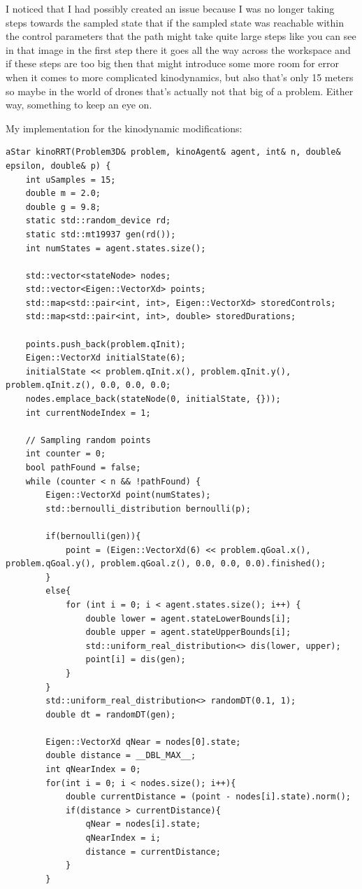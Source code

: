 \documentclass{article}
\begin{document}
I noticed that I had possibly created an issue because I was no longer taking steps towards the sampled state that if the sampled state was reachable within the control parameters that the path might take quite large steps like you can see in that image in the first step there it goes all the way across the workspace and if these steps are too big then that might introduce some more room for error when it comes to more complicated kinodynamics, but also that's only 15 meters so maybe in the world of drones that's actually not that big of a problem.
Either way, something to keep an eye on.

My implementation for the kinodynamic modifications:

\begin{lstlisting}[style=cppstyle]
aStar kinoRRT(Problem3D& problem, kinoAgent& agent, int& n, double& epsilon, double& p) {
    int uSamples = 15;
    double m = 2.0;
    double g = 9.8;
    static std::random_device rd;
    static std::mt19937 gen(rd());
    int numStates = agent.states.size();
    
    std::vector<stateNode> nodes;
    std::vector<Eigen::VectorXd> points;
    std::map<std::pair<int, int>, Eigen::VectorXd> storedControls;
    std::map<std::pair<int, int>, double> storedDurations;

    points.push_back(problem.qInit);
    Eigen::VectorXd initialState(6);
    initialState << problem.qInit.x(), problem.qInit.y(), problem.qInit.z(), 0.0, 0.0, 0.0;
    nodes.emplace_back(stateNode(0, initialState, {}));
    int currentNodeIndex = 1;

    // Sampling random points
    int counter = 0;
    bool pathFound = false;
    while (counter < n && !pathFound) {
        Eigen::VectorXd point(numStates);
        std::bernoulli_distribution bernoulli(p);

        if(bernoulli(gen)){
            point = (Eigen::VectorXd(6) << problem.qGoal.x(), problem.qGoal.y(), problem.qGoal.z(), 0.0, 0.0, 0.0).finished();
        }
        else{
            for (int i = 0; i < agent.states.size(); i++) {
                double lower = agent.stateLowerBounds[i];
                double upper = agent.stateUpperBounds[i];
                std::uniform_real_distribution<> dis(lower, upper);
                point[i] = dis(gen);
            }
        }
        std::uniform_real_distribution<> randomDT(0.1, 1);
        double dt = randomDT(gen);

        Eigen::VectorXd qNear = nodes[0].state;
        double distance = __DBL_MAX__;
        int qNearIndex = 0;
        for(int i = 0; i < nodes.size(); i++){
            double currentDistance = (point - nodes[i].state).norm();
            if(distance > currentDistance){
                qNear = nodes[i].state;
                qNearIndex = i;
                distance = currentDistance;
            } 
        }


\end{lstlisting}
\end{document}
